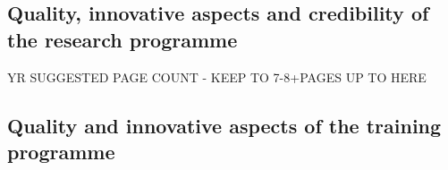 \documentclass[11pt,a4paper]{article}
\begin{document}


\vspace{-2mm}
\subsection{Quality, innovative aspects and credibility of the research programme}



\processdelayedfloats

{\scriptsize \noindent \color{red} YR SUGGESTED PAGE COUNT - KEEP TO 7-8+\numberofextrapages PAGES UP TO HERE \\
\noindent \makebox[\linewidth]{\rule{\textwidth}{0.4pt}}\normalsize }

\vspace{-2mm}
\subsection{Quality and innovative aspects of the training programme}
%
%
%
%
%
%
%
\vspace{-2mm}
\end{document}

